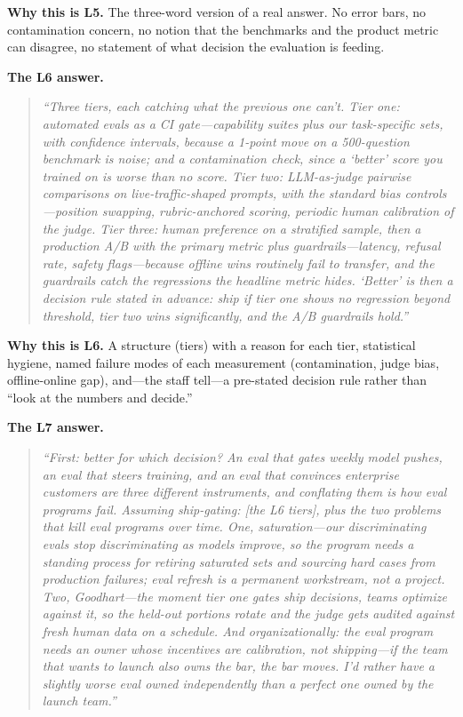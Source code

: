 \textbf{Why this is L5.} The three-word version of a real answer. No error bars, no contamination concern, no notion that the benchmarks and the product metric can disagree, no statement of what decision the evaluation is feeding.

\textbf{The L6 answer.}
\begin{quote}\itshape
``Three tiers, each catching what the previous one can't. Tier one: automated evals as a CI gate---capability suites plus our task-specific sets, with confidence intervals, because a 1-point move on a 500-question benchmark is noise; and a contamination check, since a `better' score you trained on is worse than no score. Tier two: LLM-as-judge pairwise comparisons on live-traffic-shaped prompts, with the standard bias controls---position swapping, rubric-anchored scoring, periodic human calibration of the judge. Tier three: human preference on a stratified sample, then a production A/B with the primary metric plus guardrails---latency, refusal rate, safety flags---because offline wins routinely fail to transfer, and the guardrails catch the regressions the headline metric hides. `Better' is then a decision rule stated in advance: ship if tier one shows no regression beyond threshold, tier two wins significantly, and the A/B guardrails hold.''
\end{quote}

\textbf{Why this is L6.} A structure (tiers) with a reason for each tier, statistical hygiene, named failure modes of each measurement (contamination, judge bias, offline-online gap), and---the staff tell---a pre-stated decision rule rather than ``look at the numbers and decide.''

\textbf{The L7 answer.}
\begin{quote}\itshape
``First: better for which decision? An eval that gates weekly model pushes, an eval that steers training, and an eval that convinces enterprise customers are three different instruments, and conflating them is how eval programs fail. Assuming ship-gating: [the L6 tiers], plus the two problems that kill eval programs over time. One, saturation---our discriminating evals stop discriminating as models improve, so the program needs a standing process for retiring saturated sets and sourcing hard cases from production failures; eval refresh is a permanent workstream, not a project. Two, Goodhart---the moment tier one gates ship decisions, teams optimize against it, so the held-out portions rotate and the judge gets audited against fresh human data on a schedule. And organizationally: the eval program needs an owner whose incentives are calibration, not shipping---if the team that wants to launch also owns the bar, the bar moves. I'd rather have a slightly worse eval owned independently than a perfect one owned by the launch team.''
\end{quote}

